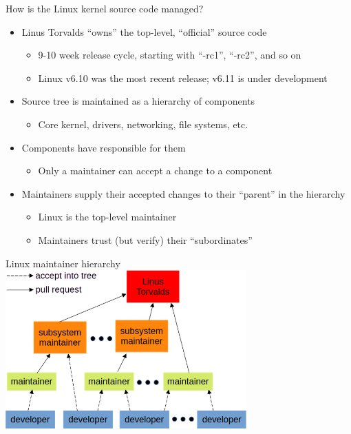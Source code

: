 \documentclass[aspectratio=169, notes]{beamer}
\begin{document}
\begin{frame}{How is the Linux kernel source code managed?}
	\begin{itemize}
	\item Linus Torvalds ``owns'' the top-level, ``official'' source code
		\begin{itemize}
		\item 9-10 week release cycle, starting with ``-rc1'', ``-rc2'', and so on
		\item Linux v6.10 was the most recent release; v6.11 is under development
		\end{itemize}
	\item Source tree is maintained as a hierarchy of components
		\begin{itemize}
		\item Core kernel, drivers, networking, file systems, etc.
		\end{itemize}
	\item Components have  responsible for them
		\begin{itemize}
		\item Only a maintainer can accept a change to a component
		\end{itemize}
	\item Maintainers supply their accepted changes to their ``parent'' in the hierarchy
		\begin{itemize}
		\item Linux is the top-level maintainer
		\item Maintainers trust (but verify) their ``subordinates''
		\end{itemize}
	\end{itemize}
\end{frame}

\begin{frame}{Linux maintainer hierarchy}
	\includegraphics[width=25em]{maintainer_hierarchy.png}
\end{frame}
\end{document}
